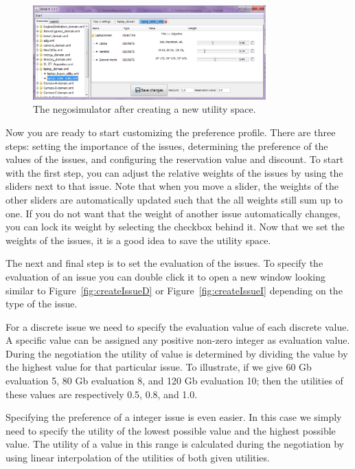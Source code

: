 \documentclass[]{article}
\begin{document}
\begin{figure}[htb]
	\centering
	\includegraphics[width=0.8\textwidth]{media/image8.png}
\caption{The negosimulator after creating a new utility space.}\label{fig:utilcreated}
\end{figure}

Now you are ready to start customizing the preference profile. There are three steps: setting the importance of the issues, determining the preference of the values of the issues, and configuring the reservation value and discount. To start with the first step, you can adjust the relative weights of the issues by using the sliders next to that issue. Note that when you move a slider, the weights of the other sliders are automatically updated such that the all weights still sum up to one. If you do not want that the weight of another issue automatically changes, you can lock its weight by selecting the checkbox behind it. Now that we set the weights of the issues, it is a good idea to save the utility space.

The next and final step is to set the evaluation of the issues. To specify the evaluation of an issue you can double click it to open a new window looking similar to Figure~\ref{fig:createIssueD} or Figure~\ref{fig:createIssueI} depending on the type of the issue.

For a discrete issue we need to specify the evaluation value of each discrete value. A specific value can be assigned any positive non-zero integer as evaluation value. During the negotiation the utility of value is determined by dividing the value by the highest value for that particular issue. To illustrate, if we give 60 Gb evaluation 5, 80 Gb evaluation 8, and 120 Gb evaluation 10; then the utilities of these values are respectively 0.5, 0.8, and 1.0.

Specifying the preference of a integer issue is even easier. In this case we simply need to specify the utility of the lowest possible value and the highest possible value. The utility of a value in this range is calculated during the negotiation by using linear interpolation of the utilities of both given utilities.
\end{document}
